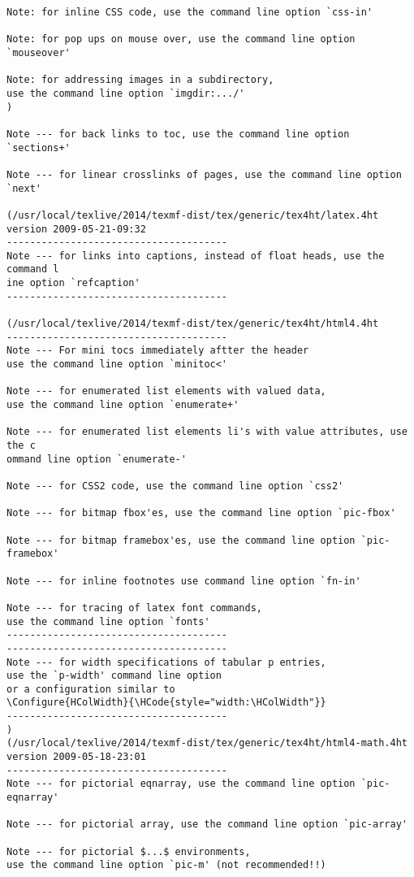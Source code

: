\begin{Verbatim}[fontsize=\tiny]
Note: for inline CSS code, use the command line option `css-in'

Note: for pop ups on mouse over, use the command line option `mouseover'

Note: for addressing images in a subdirectory, 
use the command line option `imgdir:.../'
)

Note --- for back links to toc, use the command line option `sections+'

Note --- for linear crosslinks of pages, use the command line option `next'

(/usr/local/texlive/2014/texmf-dist/tex/generic/tex4ht/latex.4ht
version 2009-05-21-09:32
--------------------------------------
Note --- for links into captions, instead of float heads, use the command l
ine option `refcaption'
--------------------------------------

(/usr/local/texlive/2014/texmf-dist/tex/generic/tex4ht/html4.4ht
--------------------------------------
Note --- For mini tocs immediately aftter the header 
use the command line option `minitoc<'

Note --- for enumerated list elements with valued data, 
use the command line option `enumerate+'

Note --- for enumerated list elements li's with value attributes, use the c
ommand line option `enumerate-'

Note --- for CSS2 code, use the command line option `css2'

Note --- for bitmap fbox'es, use the command line option `pic-fbox'

Note --- for bitmap framebox'es, use the command line option `pic-framebox'

Note --- for inline footnotes use command line option `fn-in'

Note --- for tracing of latex font commands, 
use the command line option `fonts'
--------------------------------------
--------------------------------------
Note --- for width specifications of tabular p entries, 
use the `p-width' command line option 
or a configuration similar to 
\Configure{HColWidth}{\HCode{style="width:\HColWidth"}}
--------------------------------------
)
(/usr/local/texlive/2014/texmf-dist/tex/generic/tex4ht/html4-math.4ht
version 2009-05-18-23:01
--------------------------------------
Note --- for pictorial eqnarray, use the command line option `pic-eqnarray'

Note --- for pictorial array, use the command line option `pic-array'

Note --- for pictorial $...$ environments, 
use the command line option `pic-m' (not recommended!!)


\end{Verbatim}
